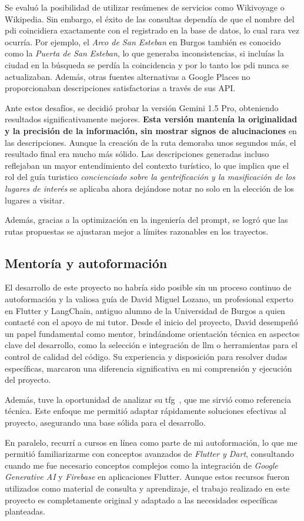 Se evaluó la posibilidad de utilizar resúmenes de servicios como Wikivoyage o Wikipedia. Sin embargo, el éxito de las consultas dependía de que el nombre del \acrshort{pdi} coincidiera exactamente con el registrado en la base de datos, lo cual rara vez ocurría. Por ejemplo, el \textit{Arco de San Esteban} en Burgos también es conocido como la \textit{Puerta de San Esteban}, lo que generaba inconsistencias, si incluías la ciudad en la búsqueda se perdía la coincidencia y por lo tanto los \acrlong{pdi} nunca se actualizaban. Además, otras fuentes alternativas a Google Places no proporcionaban descripciones satisfactorias a través de sus API.

Ante estos desafíos, se decidió probar la versión Gemini 1.5 Pro, obteniendo resultados significativamente mejores. \textbf{Esta versión mantenía la originalidad y la precisión de la información, sin mostrar signos de alucinaciones} en las descripciones. Aunque la creación de la ruta demoraba unos segundos más, el resultado final era mucho más sólido. Las descripciones generadas incluso reflejaban un mayor entendimiento del contexto turístico, lo que implica que el rol del guía turistico \textit{concienciado sobre la gentrificación y la masificación de los lugares de interés} se aplicaba ahora dejándose notar no solo en la elección de los lugares a visitar.

Además, gracias a la optimización en la ingeniería del prompt, se logró que las rutas propuestas se ajustaran mejor a límites razonables en los trayectos.

\subsection{Mentoría y autoformación}

El desarrollo de este proyecto no habría sido posible sin un proceso continuo de autoformación y la valiosa guía de David Miguel Lozano, un profesional experto en Flutter y LangChain, antiguo alumno de la Universidad de Burgos a quien contacté con el apoyo de mi tutor. Desde el inicio del proyecto, David desempeñó un papel fundamental como mentor, brindándome orientación técnica en aspectos clave del desarrollo, como la selección e integración de \acrlong{llm} o herramientas para el control de calidad del código. Su experiencia y disposición para resolver dudas específicas,  marcaron una diferencia significativa en mi comprensión y ejecución del proyecto.

Además, tuve la oportunidad de analizar su \acrlong{tfg}~\cite{go-bees}, que me sirvió como referencia técnica. Este enfoque me permitió adaptar rápidamente soluciones efectivas al proyecto, asegurando una base sólida para el desarrollo.

En paralelo, recurrí a cursos en línea como parte de mi autoformación, lo que me permitió familiarizarme con conceptos avanzados de \textit{Flutter y Dart}, consultando cuando me fue necesario conceptos complejos como la integración de \textit{Google Generative AI} y \textit{Firebase} en aplicaciones Flutter. Aunque estos recursos fueron utilizados como material de consulta y aprendizaje, el trabajo realizado en este proyecto es completamente original y adaptado a las necesidades específicas planteadas.